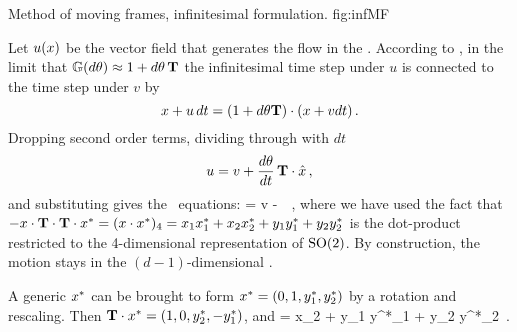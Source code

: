 {}{
Method of moving frames, infinitesimal formulation.
}
{fig:infMF}

Let $u(x)$ be the vector field that generates the flow in
the \reducedsp. According to , in
the limit that $\mathbb{G}(d\theta) \approx 1+d\theta\,\mathbf{T}$ the
infinitesimal time step under $u$ is connected to the time
step under $v$ by
\[
 x+u\,dt=  (1+d\theta\mathbf{T})\cdot(x+v dt)\,.
\]
Dropping second order terms, dividing through with $dt$
\[
 u = v+\frac{d\theta}{dt} \,\mathbf{T}\cdot\hat{x}
 \,,
\]
and substituting  gives the \reducedsp\ equations:
\beq
\dot{\ssp} = v - 
                 \, \Lg \cdot \ssp
\,,
where we have used the fact that
$- \ssp \cdot \Lg\cdot\Lg \cdot \ssp^{*}
 = (\ssp \cdot \ssp^{*})_4 =
    x_1 x_1^{*}
   +x_2 x_2^{*}
   +y_1 y_1^{*}
   +y_2 y_2^{*}
$
is the dot-product restricted to the 4-dimensional
representation of $\SOn{2}$. By construction, the motion
stays in the $(d\!-\!1)$-dimensional \slice.

A generic  $ \ssp^{*}$ can be brought to form $ \ssp^{*} =
(0,1,y_1^{*},y_2^{*})$ by a rotation and rescaling. Then $\Lg
\cdot \ssp^{*}  = (1,0,y_2^{*},-y_1^{*})$, and
\beq
{} =
     {x_2 + y_1 y^{*}_1 + y_2 y^{*}_2}
\,.
\label{PCsectSin}
\eeq


